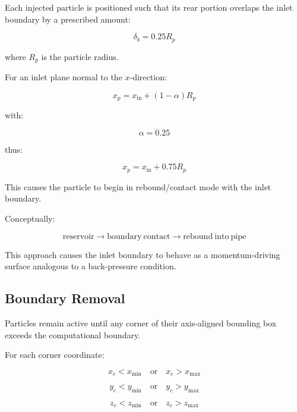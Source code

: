 \documentclass[11pt]{article}
\begin{document}
Each injected particle is positioned such that its rear portion overlaps the inlet boundary by a prescribed amount:

\begin{equation}
\delta_b
=
0.25R_p
\end{equation}

where $R_p$ is the particle radius.

For an inlet plane normal to the $x$-direction:

\begin{equation}
x_p
=
x_{\mathrm{in}}
+
(1-\alpha)R_p
\end{equation}

with:

\begin{equation}
\alpha = 0.25
\end{equation}

thus:

\begin{equation}
x_p
=
x_{\mathrm{in}}
+
0.75R_p
\end{equation}

This causes the particle to begin in rebound/contact mode with the inlet boundary.

Conceptually:

\begin{equation}
\mathrm{reservoir}
\rightarrow
\mathrm{boundary\ contact}
\rightarrow
\mathrm{rebound\ into\ pipe}
\end{equation}

This approach causes the inlet boundary to behave as a momentum-driving surface analogous to a back-pressure condition.

\subsection{Boundary Removal}

Particles remain active until any corner of their axis-aligned bounding box exceeds the computational boundary.

For each corner coordinate:

\begin{equation}
x_c < x_{\min}
\quad
\mathrm{or}
\quad
x_c > x_{\max}
\end{equation}

\begin{equation}
y_c < y_{\min}
\quad
\mathrm{or}
\quad
y_c > y_{\max}
\end{equation}

\begin{equation}
z_c < z_{\min}
\quad
\mathrm{or}
\quad
z_c > z_{\max}
\end{equation}
\end{document}
